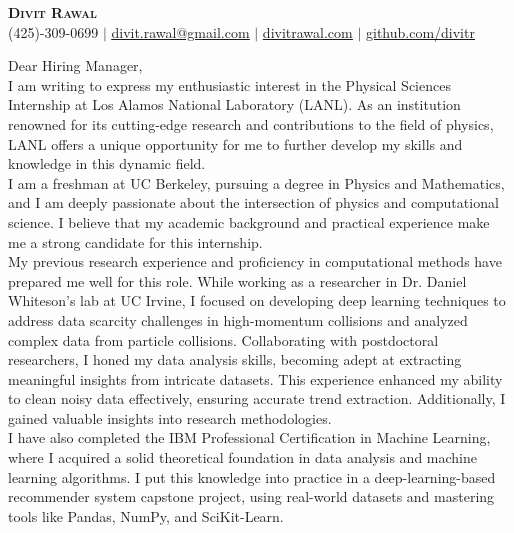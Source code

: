 \documentclass[letterpaper,11pt]{article}
\begin{document}
\begin{center}
    \textbf{\Huge \scshape Divit Rawal} \\ \vspace{1pt}
    \small (425)-309-0699 $|$ \href{mailto:divit.rawal@gmail.com}{\underline{divit.rawal@gmail.com}} $|$ 
    \href{https://www.divitrawal.com}{\underline{divitrawal.com}} $|$
    \href{https://www.github.com/divitr/}{\underline{github.com/divitr}}
\end{center}

\vspace{10mm}

Dear Hiring Manager,\\
\vspace{5mm}
I am writing to express my enthusiastic interest in the Physical Sciences Internship at Los Alamos National Laboratory (LANL). As an institution renowned for its cutting-edge research and contributions to the field of physics, LANL offers a unique opportunity for me to further develop my skills and knowledge in this dynamic field.\\
\vspace{5mm}
I am a freshman at UC Berkeley, pursuing a degree in Physics and Mathematics, and I am deeply passionate about the intersection of physics and computational science. I believe that my academic background and practical experience make me a strong candidate for this internship.\\
\vspace{5mm}
My previous research experience and proficiency in computational methods have prepared me well for this role. While working as a researcher in Dr. Daniel Whiteson's lab at UC Irvine, I focused on developing deep learning techniques to address data scarcity challenges in high-momentum collisions and analyzed complex data from particle collisions. Collaborating with postdoctoral researchers, I honed my data analysis skills, becoming adept at extracting meaningful insights from intricate datasets. This experience enhanced my ability to clean noisy data effectively, ensuring accurate trend extraction. Additionally, I gained valuable insights into research methodologies.\\
\vspace{5mm}
I have also completed the IBM Professional Certification in Machine Learning, where I acquired a solid theoretical foundation in data analysis and machine learning algorithms. I put this knowledge into practice in a deep-learning-based recommender system capstone project, using real-world datasets and mastering tools like Pandas, NumPy, and SciKit-Learn.\\
\end{document}
